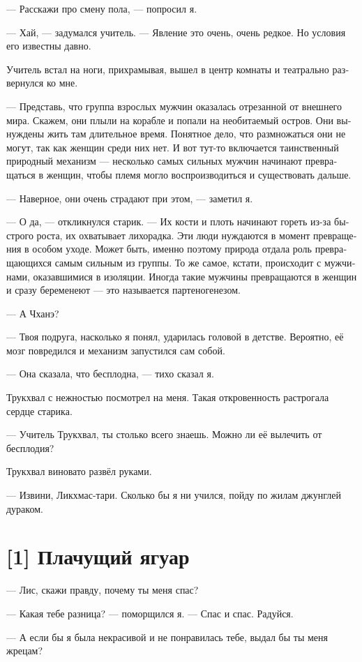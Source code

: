 \documentclass[a4paper,12pt,fleqn]{book}\usepackage{polyglossia}\setdefaultlanguage[babelshorthands=true]{russian}\setotherlanguage{english}\defaultfontfeatures{Ligatures=TeX,Mapping=tex-text}\usepackage{xcolor}\newcommand{\ml}[3]{#2}
\begin{document}
{--- Расскажи про смену пола, --- попросил я.

--- Хай, --- задумался учитель. --- Явление это очень, очень редкое.
Но условия его известны давно.

Учитель встал на ноги, прихрамывая, вышел в центр комнаты и театрально развернулся ко мне.

--- Представь, что группа взрослых мужчин оказалась отрезанной от внешнего мира.
Скажем, они плыли на корабле и попали на необитаемый остров.
Они вынуждены жить там длительное время.
Понятное дело, что размножаться они не могут, так как женщин среди них нет.
И вот тут-то включается таинственный природный механизм --- несколько самых сильных мужчин начинают превращаться в женщин, чтобы племя могло воспроизводиться и существовать дальше.

--- Наверное, они очень страдают при этом, --- заметил я.

--- О да, --- откликнулся старик.
--- Их кости и плоть начинают гореть из-за быстрого роста, их охватывает лихорадка.
Эти люди нуждаются в момент превращения в особом уходе.
Может быть, именно поэтому природа отдала роль превращающихся самым сильным из группы.
То же самое, кстати, происходит с мужчинами, оказавшимися в изоляции.
Иногда такие мужчины превращаются в женщин и сразу беременеют --- это называется партеногенезом.

--- А Чханэ?

--- Твоя подруга, насколько я понял, ударилась головой в детстве.
Вероятно, её мозг повредился и механизм запустился сам собой.

--- Она сказала, что бесплодна, --- тихо сказал я.

Трукхвал с нежностью посмотрел на меня.
Такая откровенность растрогала сердце старика.

--- Учитель Трукхвал, ты столько всего знаешь.
Можно ли её вылечить от бесплодия?

Трукхвал виновато развёл руками.

--- Извини, Ликхмас-тари.
Сколько бы я ни учился, пойду по жилам джунглей дураком.

\section{[1] Плачущий ягуар}

--- Лис, скажи правду, почему ты меня спас?

--- Какая тебе разница? --- поморщился я.
--- Спас и спас.
Радуйся.

--- А если бы я была некрасивой и не понравилась тебе, выдал бы ты меня жрецам?

}
\end{document}
